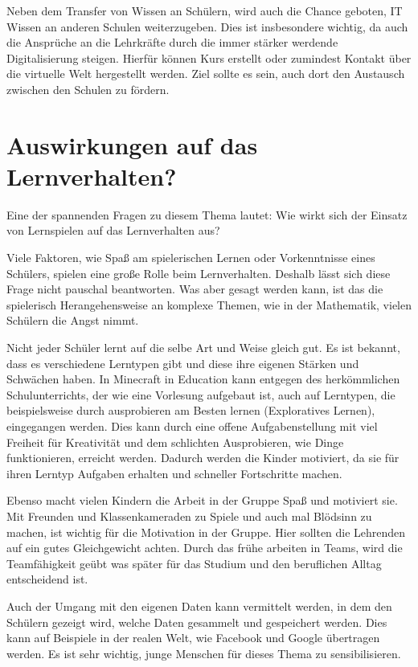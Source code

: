 Neben dem Transfer von Wissen an Schülern, wird auch die Chance geboten, IT Wissen an anderen Schulen weiterzugeben. Dies ist insbesondere wichtig, da auch die Ansprüche an die Lehrkräfte durch die immer stärker werdende Digitalisierung steigen. Hierfür können Kurs erstellt oder zumindest Kontakt über die virtuelle Welt hergestellt werden. Ziel sollte es sein, auch dort den Austausch zwischen den Schulen zu fördern.

\section{Auswirkungen auf das Lernverhalten?}

Eine der spannenden Fragen zu diesem Thema lautet: Wie wirkt sich der Einsatz von Lernspielen auf das Lernverhalten aus?

Viele Faktoren, wie Spaß am spielerischen Lernen oder Vorkenntnisse eines Schülers, spielen eine große Rolle beim Lernverhalten. Deshalb lässt sich diese Frage nicht pauschal beantworten. Was aber gesagt werden kann, ist das die spielerisch Herangehensweise an komplexe Themen, wie in der Mathematik, vielen Schülern die Angst nimmt.

Nicht jeder Schüler lernt auf die selbe Art und Weise gleich gut. Es ist bekannt, dass es verschiedene Lerntypen gibt und diese ihre eigenen Stärken und Schwächen haben. In Minecraft in Education kann entgegen des herkömmlichen Schulunterrichts, der wie eine Vorlesung aufgebaut ist, auch auf Lerntypen, die beispielsweise durch ausprobieren am Besten lernen (Exploratives Lernen), eingegangen werden. Dies kann durch eine offene Aufgabenstellung mit viel Freiheit für Kreativität und dem schlichten Ausprobieren, wie Dinge funktionieren, erreicht werden. Dadurch werden die Kinder motiviert, da sie für ihren Lerntyp Aufgaben erhalten und schneller Fortschritte machen.

Ebenso macht vielen Kindern die Arbeit in der Gruppe Spaß und motiviert sie. Mit Freunden und Klassenkameraden zu Spiele und auch mal Blödsinn zu machen, ist wichtig für die Motivation in der Gruppe. Hier sollten die Lehrenden auf ein gutes Gleichgewicht achten. Durch das frühe arbeiten in Teams, wird die Teamfähigkeit geübt was später für das Studium und den beruflichen Alltag entscheidend ist.



Auch der Umgang mit den eigenen Daten kann vermittelt werden, in dem den Schülern gezeigt wird, welche Daten gesammelt und gespeichert werden. Dies kann auf Beispiele in der realen Welt, wie Facebook und Google übertragen werden. Es ist sehr wichtig, junge Menschen für dieses Thema zu sensibilisieren.

